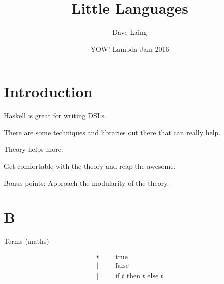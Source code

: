 \documentclass{beamer}
\title{Little Languages}
\author{Dave Laing}
\date{YOW! Lambda Jam 2016}
\begin{document}
\begin{frame}
\maketitle
\end{frame}

\section{Introduction}

\begin{frame}[c]
  \begin{center}
    Haskell is great for writing DSLs.
  \end{center}
\end{frame}

\begin{frame}[c]
  \begin{center}
    There are some techniques and libraries out there that can really help.
  \end{center}
\end{frame}

\begin{frame}[c]
  \begin{center}
    Theory helps more.
  \end{center}
\end{frame}

\begin{frame}[c]
  \begin{center}
    Get comfortable with the theory and reap the awesome.
  \end{center}
\end{frame}

\begin{frame}[c]
  \begin{center}
   Bonus points: Approach the modularity of the theory. 
  \end{center}
\end{frame}

\section{B}

\begin{frame}[c]
  \begin{center}
Terms (maths)
  \end{center}
  \begin{displaymath}
    \begin{aligned}
t =& \ \text{true} \\
  |& \ \text{false}  \\
  |& \ \text{if $t$ then $t$ else $t$}
    \end{aligned}
  \end{displaymath}
\end{frame}
\end{document}
